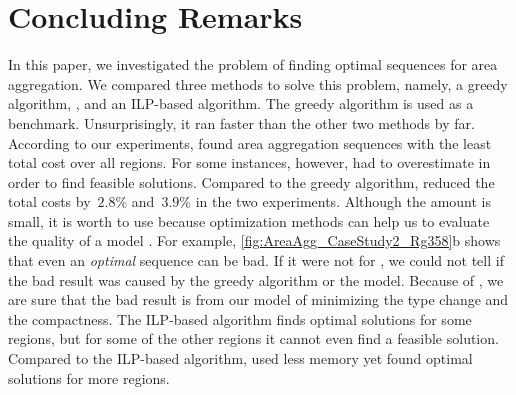 \documentclass[acmsmall,natbib=false]{acmart}
\begin{document}


\section{Concluding Remarks}
\label{sec:AreaAgg_Conclusions}
In this paper, we investigated the problem of 
finding optimal sequences for area aggregation.
We compared three methods to solve this problem, namely, 
a greedy algorithm, \Astar, and an ILP-based algorithm.
The greedy algorithm is used as a benchmark.
Unsurprisingly, it ran faster than the other two methods by far.
According to our experiments, \Astar found area aggregation 
sequences
with the least total cost over all regions.
For some instances, however, \Astar had to overestimate
in order to find feasible solutions.
Compared to the greedy algorithm, 
\Astar reduced the total costs by~$2.8\%$ and~$3.9\%$
in the two experiments.
Although the amount is small, it is worth to use \Astar
because optimization methods can help us 
to evaluate the quality of a model 
\parencite{Haunert2017Label,Haunert2008Assuring,Haunert2016Optimization}.
For example, \fig\ref{fig:AreaAgg_CaseStudy2_Rg358}b shows that
even an \emph{optimal} sequence can be bad.
If it were not for \Astar, 
we could not tell if the bad result was caused 
by the greedy algorithm or the model.
Because of \Astar, we are sure that the bad result is from
our model of minimizing the 
type change and the compactness.
The ILP-based algorithm finds optimal solutions for some regions,
but for some of the other regions 
it cannot even find a feasible solution.
Compared to the ILP-based algorithm,
\Astar used less memory 
yet found optimal solutions for more regions.

\end{document}
